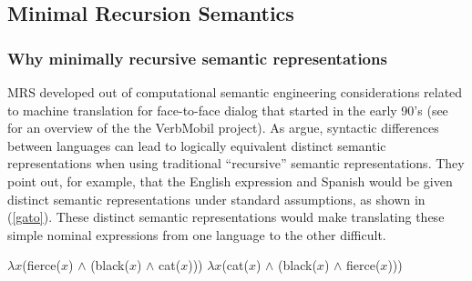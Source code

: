 \documentclass[output=paper]{langsci/langscibook}
\begin{document}
\subsection{Minimal Recursion Semantics}

\subsubsection{Why minimally recursive semantic representations}

MRS developed out of computational semantic engineering considerations related to machine translation for face-to-face dialog that started in the early 90's (see \citealt{Kayetal1992} for an overview of the the VerbMobil project). As \citet{Copestakeetal1995} argue, syntactic differences between languages can lead to logically equivalent distinct semantic representations when using traditional ``recursive'' semantic representations. They point out, for example, that the English expression  and Spanish  would be given distinct semantic representations under standard assumptions, as shown in (\ref{gato}). These distinct semantic representations would make translating these simple nominal expressions from one language to the other difficult.

\begin{exe}
\ex\label{gato}
\begin{xlist}
\ex\label{gatoa}
$\lambda x$(fierce($x$) $\wedge$ (black($x$) $\wedge$ cat($x$)))
\ex\label{gatob}
$\lambda x$(cat($x$) $\wedge$ (black($x$) $\wedge$ fierce($x$)))
\end{xlist}
\end{exe}
\end{document}
